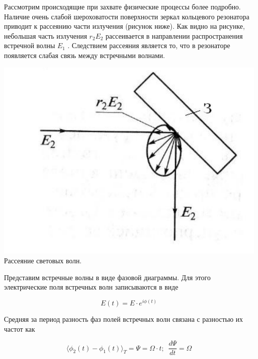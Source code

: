 \documentclass[a4paper,12pt]{article} %
\begin{document}
Рассмотрим происходящие при захвате физические процессы более подробно. Наличие очень слабой шероховатости поверхности зеркал кольцевого
резонатора приводит к рассеянию части излучения (рисунок ниже). Как видно на рисунке, небольшая часть излучения $r_2E_2$ рассеивается в направлении распространения встречной волны $E_1$ . Следствием рассеяния является то, что в резонаторе появляется слабая связь между встречными волнами.

\begin{center}
    \includegraphics[scale=0.6]{pic5}\\
    \caption{Рассеяние световых волн.}
\end{center}

Представим встречные волны в виде фазовой диаграммы. Для этого электрические поля встречных волн записываются в виде

\begin{equation*}
    E(t) = E \cdot e^{i \phi(t)}
\end{equation*}

Средняя за период разность фаз полей встречных волн связана с разностью
их частот как

\begin{equation}
    \langle \phi_2(t) - \phi_1(t) \rangle_T = \Psi = \Omega \cdot t; \,\,\,
    \frac{d\Psi} {dt} = \Omega
\end{equation}
\end{document}
